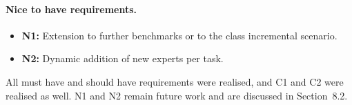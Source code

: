 \paragraph{Nice to have requirements.}
\begin{itemize}[leftmargin=2em]
  \item \textbf{N1:} Extension to further benchmarks or to the class
        incremental scenario.
  \item \textbf{N2:} Dynamic addition of new experts per task.
\end{itemize}

All must have and should have requirements were realised, and C1 and C2
were realised as well. N1 and N2 remain future work and are discussed in
Section~8.2.
